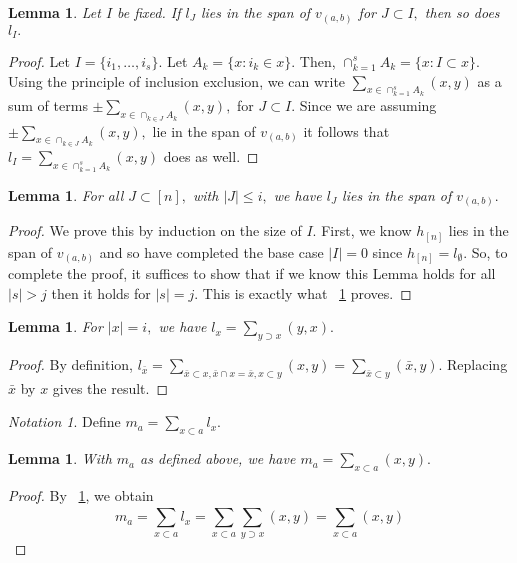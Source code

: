 \documentclass[10 pt]{amsart}
\theoremstyle{plain}
\newtheorem{lem}[thm]{Lemma}
\theoremstyle{definition}
\theoremstyle{remark}
\newtheorem{note}[thm]{Notation}
\numberwithin{equation}{section}
\begin{document}
\begin{lem}
\label{l_induction_step}
Let $I$ be fixed. If $l_J$ lies in the span of $v_{(a, b)}$ for $J \subset I,$ then so does $l_I.$

\end{lem}
\begin{proof}
Let $I = \{i_1,\ldots, i_s\}.$ Let $A_k = \{x \colon i_k \in x\}.$ Then, $\cap_{k=1}^s A_k = \{x \colon I \subset x\}.$ Using the principle of inclusion exclusion, we can write $\sum_{x \in\cap_{k=1}^s A_k} (x, y)$ as a sum of terms $\pm \sum_{x \in\cap_{k \in J} A_k} (x, y),$ for $J \subset I.$ Since we are assuming $\pm \sum_{x \in\cap_{k \in J} A_k} (x, y),$ lie in the span of $v_{(a, b)}$ it follows that $l_I = \sum_{x \in\cap_{k=1}^s A_k} (x, y)$ does as well.

\end{proof}

\begin{lem}
For all $J \subset [n],$ with $|J| \leq i,$ we have $l_{J}$ lies in the span of $v_{(a , b)}.$ 
\end{lem}
\begin{proof}
We prove this by induction on the size of $I.$ First, we know $h_{[n]}$ lies in the span of $v_{(a, b)}$ and so have completed the base case $|I| = 0$ since $h_{[n]} = l_{\emptyset}.$ So, to complete the proof, it suffices to show that if we know this Lemma holds for all $|s|>j$ then it holds for $|s| = j.$  This is exactly what ~\ref{l_induction_step} proves.
\end{proof}

\begin{lem}
\label{l_diag_equivalence}
For $|x| = i,$ we have $l_{x} = \sum_{y \supset x}^{}(y, x).$
\end{lem}
\begin{proof}
By definition, $l_{\bar x} = \sum_{\bar x\subset x,\bar x \cap x = \bar x,x\subset y}^{}(x, y) = \sum_{\bar x\subset y}^{}(\bar x, y).$ Replacing $\bar x$ by $x$ gives the result.
\end{proof}

\begin{note}
Define $m_a = \sum_{x \subset a}^{}l_{x}.$
\end{note}

\begin{lem}
\label{m_equivalence}
With $m_a$ as defined above, we have $m_a = \sum_{x\subset a}^{}(x, y).$
\end{lem}
\begin{proof}
By ~\ref{l_diag_equivalence}, we obtain
$$m_a = \sum_{x \subset a}^{}l_{x} = \sum_{x \subset a}^{}\sum_{y \supset x}^{}(x,y)= \sum_{x\subset a}^{}(x, y)$$
\end{proof}
\end{document}
